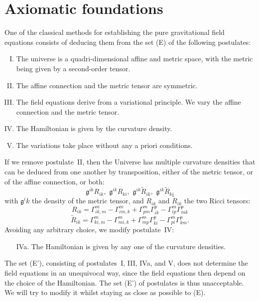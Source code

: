 \documentclass{article}
\theoremstyle{plain}
\theoremstyle{definition}
\renewcommand{\gg}{\mathfrak{g}}
\newcommand{\oldpage}[1]{\marginpar{\footnotesize$\Big\vert$ \textit{p.~#1}}}
\begin{document}
\section{Axiomatic foundations}
\label{section1}

One of the classical methods for establishing the pure gravitational field equations consists of deducing them from the set (E) of the following postulates:
\begin{enumerate}[I.]
  \item The universe is a quadri-dimensional affine and metric space, with the metric being given by a second-order tensor.
  \item The affine connection and the metric tensor are symmetric.
  \item The field equations derive from a variational principle.
\oldpage{10-02}
    We vary the affine connection and the metric tensor.
  \item The Hamiltonian is given by the curvature density.
  \item The variations take place without any a priori conditions.
\end{enumerate}

If we remove postulate~II, then the Universe has multiple curvature densities that can be deduced from one another by transposition, either of the metric tensor, or of the affine connection, or both:
\[
  \gg^{ik}R_{ik}, \,\,
  \gg^{ik}R_{ki}, \,\,
  \gg^{ik}\widetilde{R}_{ik}, \,\,
  \gg^{ik}\widetilde{R}_{ki}
\]
with $\gg^ik$ the density of the metric tensor, and $R_{ik}$ and $\widetilde{R}_{ik}$ the two Ricci tensors:
\[
\label{equation1}
  R_{ik} = \Gamma_{ik,m}^m - \Gamma_{im,k}^m + \Gamma_{pm}^m\Gamma_{ik}^p - \Gamma_{ip}^m\Gamma_{mk}^p
  \tag{1}
\]
\[
\label{equation2}
  \widetilde{R}_{ik} = \Gamma_{ki,m}^m - \Gamma_{mi,k}^m + \Gamma_{mp}^m\Gamma_{ki}^p - \Gamma_{pi}^m\Gamma_{km}^p.
  \tag{2}
\]
Avoiding any arbitrary choice, we modify postulate~IV:
\begin{enumerate}
  \item[IVa.] The Hamiltonian is given by any one of the curvature densities.
\end{enumerate}

The set (E'), consisting of postulates~I, III, IVa, and V, does not determine the field equations in an unequivocal way, since the field equations then depend on the choice of the Hamiltonian.
The set (E') of postulates is thus unacceptable.
We will try to modify it whilst staying as close as possible to (E).
\end{document}
